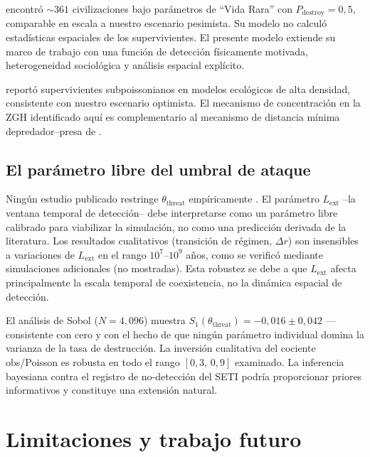 \documentclass[11pt,a4paper,onecolumn]{article}
\begin{document}
\begin{table}[h]
\citet{forgan2009} encontró $\sim 361$ civilizaciones bajo parámetros
de ``Vida Rara'' con $P_\text{destroy} = 0{,}5$, comparable en escala
a nuestro escenario pesimista.
Su modelo no calculó estadísticas espaciales de los supervivientes.
El presente modelo extiende su marco de trabajo con una función de
detección físicamente motivada, heterogeneidad sociológica y análisis
espacial explícito.

\citet{foucher2023} reportó supervivientes subpoissonianos en modelos
ecológicos de alta densidad, consistente con nuestro escenario
optimista.
El mecanismo de concentración en la ZGH identificado aquí es
complementario al mecanismo de distancia mínima depredador--presa de
\citet{foucher2023}.

\subsection{El parámetro libre del umbral de ataque}

Ningún estudio publicado restringe $\theta_\text{threat}$
empíricamente \citep{devladar2013}.
El parámetro $L_\text{ext}$ --la ventana temporal de detección--
debe interpretarse como un parámetro libre calibrado para viabilizar
la simulación, no como una predicción derivada de la literatura. Los
resultados cualitativos (transición de régimen, $\Delta r$) son
insensibles a variaciones de $L_\text{ext}$ en el rango $10^7$--$10^9$
años, como se verificó mediante simulaciones adicionales (no mostradas).
Esta robustez se debe a que $L_\text{ext}$ afecta principalmente la
escala temporal de coexistencia, no la dinámica espacial de detección.

El análisis de Sobol ($N = 4{,}096$) muestra
$S_1(\theta_\text{threat}) = -0{,}016 \pm 0{,}042$ — consistente con
cero y con el hecho de que ningún parámetro individual domina la
varianza de la tasa de destrucción.
La inversión cualitativa del cociente obs/Poisson es robusta en todo
el rango $[0{,}3,\,0{,}9]$ examinado.
La inferencia bayesiana contra el registro de no-detección del SETI
podría proporcionar priores informativos y constituye una extensión
natural.

\section{Limitaciones y trabajo futuro}
\label{sec:limitations}


\end{table}
\end{document}
